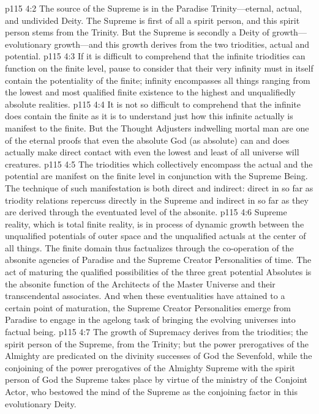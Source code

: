 \vs p115 4:2 The source of the Supreme is in the Paradise Trinity---eternal, actual, and undivided Deity. The Supreme is first of all a spirit person, and this spirit person stems from the Trinity. But the Supreme is secondly a Deity of growth---evolutionary growth---and this growth derives from the two triodities, actual and potential.
\vs p115 4:3 If it is difficult to comprehend that the infinite triodities can function on the finite level, pause to consider that their very infinity must in itself contain the potentiality of the finite; infinity encompasses all things ranging from the lowest and most qualified finite existence to the highest and unqualifiedly absolute realities.
\vs p115 4:4 It is not so difficult to comprehend that the infinite does contain the finite as it is to understand just how this infinite actually is manifest to the finite. But the Thought Adjusters indwelling mortal man are one of the eternal proofs that even the absolute God (as absolute) can and does actually make direct contact with even the lowest and least of all universe will creatures.
\vs p115 4:5 The triodities which collectively encompass the actual and the potential are manifest on the finite level in conjunction with the Supreme Being. The technique of such manifestation is both direct and indirect: direct in so far as triodity relations repercuss directly in the Supreme and indirect in so far as they are derived through the eventuated level of the absonite.
\vs p115 4:6 Supreme reality, which is total finite reality, is in process of dynamic growth between the unqualified potentials of outer space and the unqualified actuals at the center of all things. The finite domain thus factualizes through the co\hyp{}operation of the absonite agencies of Paradise and the Supreme Creator Personalities of time. The act of maturing the qualified possibilities of the three great potential Absolutes is the absonite function of the Architects of the Master Universe and their transcendental associates. And when these eventualities have attained to a certain point of maturation, the Supreme Creator Personalities emerge from Paradise to engage in the agelong task of bringing the evolving universes into factual being.
\vs p115 4:7 The growth of Supremacy derives from the triodities; the spirit person of the Supreme, from the Trinity; but the power prerogatives of the Almighty are predicated on the divinity successes of God the Sevenfold, while the conjoining of the power prerogatives of the Almighty Supreme with the spirit person of God the Supreme takes place by virtue of the ministry of the Conjoint Actor, who bestowed the mind of the Supreme as the conjoining factor in this evolutionary Deity.
